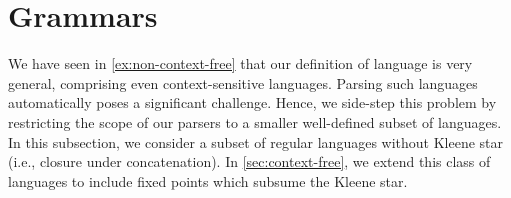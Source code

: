 
\section{Grammars}\label{sec:gram-and-parsing}

We have seen in \cref{ex:non-context-free} that our definition of language is very general, comprising even context-sensitive languages. Parsing such languages automatically poses a significant challenge. Hence, we side-step this problem by restricting the scope of our parsers to a smaller well-defined subset of languages. In this subsection, we consider a subset of regular languages without Kleene star (i.e., closure under concatenation). In \cref{sec:context-free}, we extend this class of languages to include fixed points which subsume the Kleene star.

\begin{code}[hide]%
\>[0]\AgdaSpace{}%
\AgdaSpace{}%
\<%
\end{code}
\begin{code}%
\>[0][@{}l@{\AgdaIndent{1}}]%
\>[4]\AgdaSpace{}%
\AgdaSpace{}%
\AgdaSymbol{:}\AgdaSpace{}%
\AgdaSpace{}%
\<%
\\
\>[4][@{}l@{\AgdaIndent{0}}]%
\>[8]\AgdaSpace{}%
\AgdaSymbol{:}\AgdaSpace{}%
\<%
\\
%
\>[8]\AgdaSpace{}%
\AgdaSymbol{:}\AgdaSpace{}%
\<%
\\
%
\>[8]\AgdaSpace{}%
\AgdaSymbol{:}\AgdaSpace{}%
\AgdaSymbol{(}\AgdaSpace{}%
\AgdaSymbol{:}\AgdaSpace{}%
\AgdaSymbol{)}\AgdaSpace{}%
\AgdaSpace{}%
\<%
\\
%
\>[8]\AgdaSpace{}%
\AgdaSymbol{:}\AgdaSpace{}%
\AgdaSymbol{\{}\AgdaSpace{}%
\AgdaSymbol{:}\AgdaSpace{}%
\AgdaSymbol{\}}\AgdaSpace{}%
\AgdaSpace{}%
\AgdaSpace{}%
\AgdaSpace{}%
\AgdaSpace{}%
\AgdaSpace{}%
\AgdaSpace{}%
\<%
\\
%
\>[8]\AgdaSpace{}%
\AgdaSymbol{:}\AgdaSpace{}%
\AgdaSpace{}%
\AgdaSpace{}%
\AgdaSpace{}%
\AgdaSpace{}%
\<%
\\
%
\>[8]\AgdaOperator{\AgdaInductiveConstructor{\AgdaUnderscore{}*\AgdaUnderscore{}}}\AgdaSpace{}%
\AgdaSymbol{:}\AgdaSpace{}%
\AgdaSpace{}%
\AgdaSpace{}%
\AgdaSpace{}%
\AgdaSpace{}%
\<%
\end{code}

